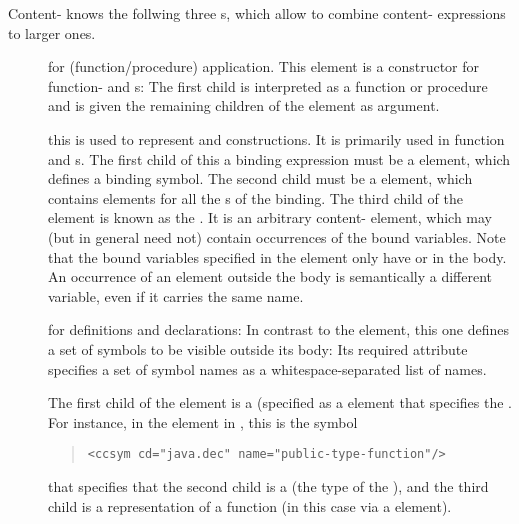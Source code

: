 Content-{\codeml} knows the follwing three {s}, which allow to combine content-{\codeml}
expressions to larger ones.

\begin{description}
\item[{}] for (function/procedure)
  application.  This
  element is a constructor for function- and {s}: The first child
  is interpreted as a function or procedure and is given the remaining children of
  the {} element as argument.
\item[{}] this {} {} is used to
  represent {} and {} constructions. It is
  primarily used in function and {s}.
  The first child of this a {\codeml} binding expression must be a
  {} element, which defines a binding symbol. The second child must
  be a {} element, which contains {} elements for all
  the {s} of the binding. The
  third child of the {} element is known as the {}.
  It is an arbitrary content-{\codeml} element, which may (but in general need
  not) contain occurrences of the bound variables. Note that the bound variables
  specified in the {} element only have or {} in the
  body. An occurrence of an {} element outside the body is
  semantically a different variable, even if it carries the same name.
\item[{}] for definitions and declarations: In contrast to the
  {} element, this one defines a set of symbols to be visible
  outside its body: Its required {} attribute specifies
  a set of symbol names as a whitespace-separated list of names. 
  
  The first child of the {} element is a {} (specified as a {} element
  that specifies the {}.  For
  instance, in the {} element in {},
  this is the symbol
  \begin{quote}
    {\lstinline[basicstyle=\small]{<ccsym cd="java.dec" name="public-type-function"/>}}     
  \end{quote}
  that specifies that the second child is a {} (the type of the
  {}), and the third child is a
  representation of a function (in this case via a {} element).
\end{description}

